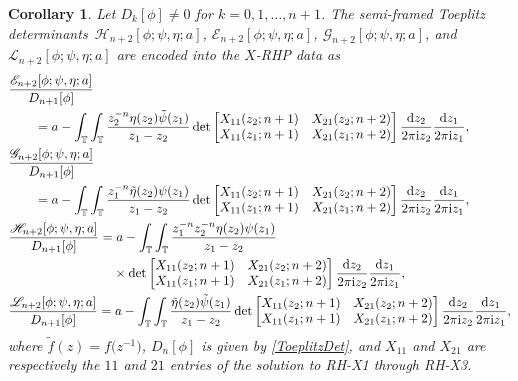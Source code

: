 \documentclass[10pt,a4paper]{amsart}
\numberwithin{equation}{section}
\newtheorem{Corollary}[Theorem]{Corollary}
\newcommand{\T}{{\mathbb T}}
\newcommand{\ii}{{\rm i}}
\newcommand{\dd}{{\rm d}}
\begin{document}
	\begin{Corollary}\label{EGL and RHP intro}
		Let $D_k[\phi] \neq 0$ for $k=0,1,\dots, n+1$. The semi-framed Toeplitz determinants~${\mathscr{H}_{n+2}[\phi; \psi, \eta ;a]}$, $\mathscr{E}_{n+2}[\phi; \psi, \eta ;a]$, $\mathscr{G}_{n+2}[\phi; \psi, \eta ;a]$, and $\mathscr{L}_{n+2}[\phi; \psi, \eta ;a]$ are encoded into the $X$-RHP data as
		\begin{align}
& \frac{\mathscr{E}_{n+2}[\phi;\psi, \eta ;a]}{D_{n+1}[\phi]}\nonumber \\
&\qquad= a - \int_{\T} \int_{\T} \frac{z^{-n}_2\eta(z_2) \Tilde{\psi}(z_1)}{z_1-z_2} \det \begin{bmatrix}
				X_{11}(z_2;n+1) & X_{21}(z_2;n+2) \\
				X_{11}(z_1;n+1) & X_{21}(z_1;n+2)
			\end{bmatrix} \frac{\dd z_2}{2 \pi \ii z_2} \frac{\dd z_1}{2 \pi \ii z_1}, 				\label{E and X-RHP} \\
& 		\frac{\mathscr{G}_{n+2}[\phi;\psi, \eta ;a]}{D_{n+1}[\phi]}\nonumber\\
&\qquad = a - \int_{\T} \int_{\T} \frac{z^{-n}_1 \tilde{\eta}(z_2) \psi(z_1)}{z_1-z_2} \det \begin{bmatrix}
				X_{11}(z_2;n+1) & X_{21}(z_2;n+2) \\
				X_{11}(z_1;n+1) & X_{21}(z_1;n+2)
			\end{bmatrix} \frac{\dd z_2}{2 \pi \ii z_2} \frac{\dd z_1}{2 \pi \ii z_1}, 			 \nonumber \\
&	 	\frac{\mathscr{H}_{n+2}[\phi;\psi, \eta ;a]}{D_{n+1}[\phi]}= a - \int_{\T} \int_{\T} \frac{z^{-n}_1z^{-n}_2\eta(z_2) \psi(z_1)}{z_1-z_2}\nonumber\\
&\phantom{\frac{\mathscr{H}_{n+2}[\phi;\psi, \eta ;a]}{D_{n+1}[\phi]}=}{} \times\det \begin{bmatrix}
				X_{11}(z_2;n+1) & X_{21}(z_2;n+2) \\
				X_{11}(z_1;n+1) & X_{21}(z_1;n+2)
			\end{bmatrix} \frac{\dd z_2}{2 \pi \ii z_2} \frac{\dd z_1}{2 \pi \ii z_1}, \label{H and X-RHP} \\
&	 	\frac{\mathscr{L}_{n+2}[\phi;\psi, \eta ;a]}{D_{n+1}[\phi]}= a - \int_{\T} \int_{\T} \frac{ \Tilde{\eta}(z_2) \tilde{\psi}(z_1)}{z_1-z_2} \det \begin{bmatrix}
				X_{11}(z_2;n+1) & X_{21}(z_2;n+2) \\
				X_{11}(z_1;n+1) & X_{21}(z_1;n+2)
			\end{bmatrix} \frac{\dd z_2}{2 \pi \ii z_2} \frac{\dd z_1}{2 \pi \ii z_1}, 				 \nonumber
		\end{align}
		where $\tilde{f}(z) = f\big(z^{-1}\big)$, $D_{n}[\phi]$ is given by \eqref{ToeplitzDet}, and $X_{11}$ and $X_{21}$ are respectively the $11$ and $21$ entries of the solution to {\rm RH-X1} through {\rm RH-X3}.
	\end{Corollary}
	
\end{document}
